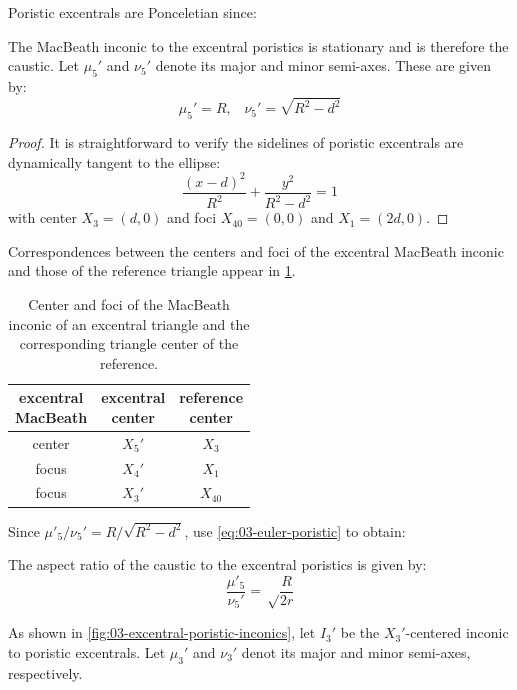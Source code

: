 Poristic excentrals are Ponceletian since:

\begin{proposition}
The MacBeath inconic to the excentral poristics is stationary and is therefore the caustic. Let $\mu_5'$ and $\nu_5'$ denote its major and minor semi-axes. These are given by:
\[ \mu_5'=R,\;\;\;\nu_5'=\sqrt{R^2-d^2} \]
\end{proposition}

\begin{proof}
It is straightforward to verify the sidelines of poristic excentrals are dynamically  tangent to the ellipse:
\[
\frac{(x-d)^2}{R^2}+\frac{y^2}{R^2-d^2}=1\]
with center $X_3=(d,0)$ and foci $X_{40}=(0,0)$ and $X_1=(2d,0)$.
\end{proof}

Correspondences between the centers and foci of the excentral MacBeath inconic and those of the reference triangle appear in \cref{tab:03-macbeath}.

\begin{table}
\centering
\begin{tabular}{|c|c|c|}
\hline
\makecell[cc]{excentral\\ MacBeath} &
\makecell[cc]{excentral\\center} &
\makecell[cc]{reference\\center} \\
\hline
center & $X_5'$ & $X_3$\\
focus & $X_4'$ & $X_1$  \\
focus & $X_3'$ & $X_{40}$ \\
\hline
\end{tabular}
\caption{Center and foci of the MacBeath inconic of an excentral triangle and the corresponding triangle center of the reference.} 
\label{tab:03-macbeath}
\end{table}

Since $\mu'_5/\nu_5'=R/\sqrt{R^2-d^2}$, use \cref{eq:03-euler-poristic} to obtain:

\begin{corollary}
The aspect ratio of the caustic to the excentral poristics is given by:
\begin{equation*}
 \frac{\mu'_5}{\nu_5'}={\sqrt\frac{R}{2 r}}
\end{equation*}
\end{corollary}

As shown in \cref{fig:03-excentral-poristic-inconics}, let $I_3'$ be the $X_3'$-centered inconic to poristic excentrals. Let $\mu_3'$ and $\nu_3'$ denot its major and minor semi-axes, respectively.

